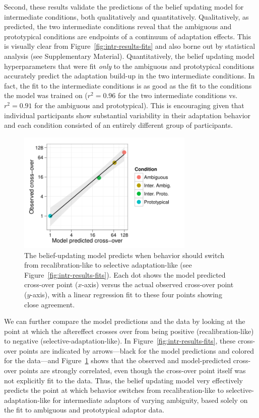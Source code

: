 Second, these results validate the predictions of the belief updating model for intermediate conditions, both qualitatively and quantitatively.  Qualitatively, as predicted, the two intermediate conditions reveal that the ambiguous and prototypical conditions are endpoints of a continuum of adaptation effects.  This is visually clear from Figure~\ref{fig:intr-results-fits} and also borne out by statistical analysis (see Supplementary Material). %
Quantitatively, the belief updating model hyperparameters that were fit \emph{only} to the ambiguous and prototypical conditions accurately predict the adaptation build-up in the two intermediate conditions.  In fact, the fit to the intermediate conditions is as good as the fit to the conditions the model was trained on ($r^2=0.96$ for the two intermediate conditions vs. $r^2=0.91$ for the ambiguous and prototypical).  This is encouraging given that individual participants show substantial variability in their adaptation behavior and each condition consisted of an entirely different group of participants.

\begin{figure}[htb]
  \centering
  \includegraphics[width=0.75\textwidth]{intr-ae-firstblock-xover-scatter-logscale.pdf}
  \caption{The belief-updating model predicts when behavior should switch from recalibration-like to selective adaptation-like (see Figure~\ref{fig:intr-results-fits}).  Each dot shows the model predicted cross-over point ($x$-axis) versus the actual observed cross-over point ($y$-axis), with a linear regression fit to these four points showing close agreement.}
\label{fig:cross-over-scatterplot}
\end{figure}

We can further compare the model predictions and the data by looking at the point at which the aftereffect crosses over from being positive (recalibration-like) to negative (selective-adaptation-like).  In Figure~\ref{fig:intr-results-fits}, these cross-over points are indicated by arrows---black for the model predictions and colored for the data---and Figure~\ref{fig:cross-over-scatterplot} shows that the observed and model-predicted cross-over points are strongly correlated, even though the cross-over point itself was not explicitly fit to the data.  Thus, the belief updating model very effectively predicts the point at which behavior switches from recalibration-like to selective-adaptation-like for intermediate adaptors of varying ambiguity, based solely on the fit to ambiguous and prototypical adaptor data.

